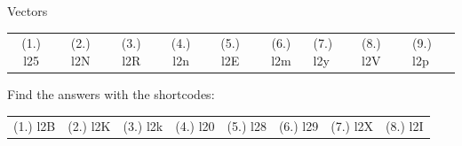 \begin{eocexercises}{Vectors}
 \par \begin{tabular}[h]{cccccc}
 (1.) l25  &  (2.) l2N  &  (3.) l2R  &  (4.) l2n  &  (5.) l2E  &  (6.) l2m  &  (7.) l2y  &  (8.) l2V  &  (9.) l2p  & \end{tabular}
      \label{m38819*uid117}
\par {} Find the answers with the shortcodes:
 \par \begin{tabular}[h]{cccccc}
 (1.) l2B  &  (2.) l2K  &  (3.) l2k  &  (4.) l20  &  (5.) l28  &  (6.) l29  &  (7.) l2X  &  (8.) l2I  & \end{tabular}
\end{eocexercises}